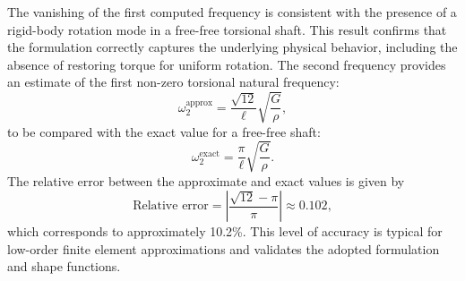 \documentclass[12pt]{article}
\begin{document}
The vanishing of the first computed frequency is consistent with the presence of a rigid-body rotation mode in a free-free torsional shaft. This result confirms that the formulation correctly captures the underlying physical behavior, including the absence of restoring torque for uniform rotation. The second frequency provides an estimate of the first non-zero torsional natural frequency:
\[
    \omega_2^{\text{approx}} = \frac{\sqrt{12}}{\ell} \sqrt{\frac{G}{\rho}},
\]
to be compared with the exact value for a free-free shaft:
\[
    \omega_2^{\text{exact}} = \frac{\pi}{\ell} \sqrt{\frac{G}{\rho}}.
\]
The relative error between the approximate and exact values is given by
\[
    \text{Relative error} = \left| \frac{\sqrt{12} - \pi}{\pi} \right| \approx 0.102,
\]
which corresponds to approximately 10.2\%. This level of accuracy is typical for low-order finite element approximations and validates the adopted formulation and shape functions.
\end{document}
